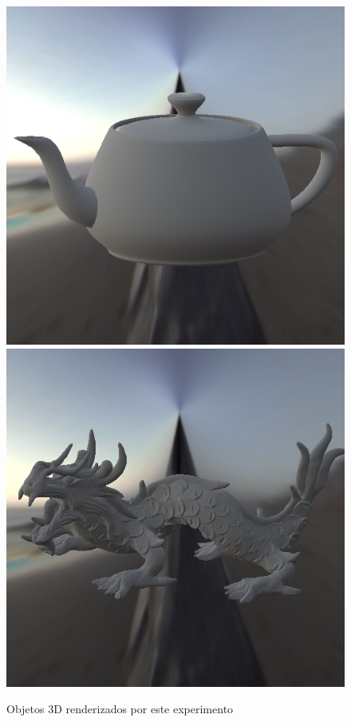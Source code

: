 \begin{figure}[H]
    \caption{\small{Objetos 3D renderizados por este experimento}}\label{fig-oren-nayar-eqlang}
  \includegraphics[width=\linewidth]{./Imagens/brdfs/oren-nayar-teapot.png}
\endminipage\hfill
{}
  \includegraphics[width=\linewidth]{./Imagens/brdfs/oren-nayar-dragon.png}

\end{figure}
